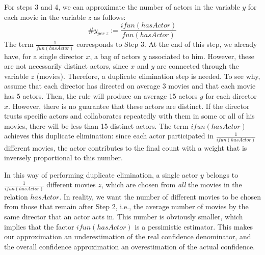 For steps 3 and 4, we can approximate the number of actors in the variable $y$ for each movie in the variable $z$ as follows:
$$
\#y_{ per \; z} := \frac{ifun(hasActor)}{fun(hasActor)}
$$
The term $\frac{1}{fun(hasActor)}$ corresponds to Step 3. At the end of this step, 
we already have, for a single director $x$, a bag of actors $y$ associated to him.
However, these are not necessarily distinct actors, since $x$ and $y$ are connected through the variable $z$ (movies). Therefore, a duplicate elimination step is needed.
To see why, assume that each director has directed on average 3 movies and that each movie has 5 actors. Then, the rule will produce on average 15 actors $y$ for each director $x$.
However, there is no guarantee that these actors are distinct.
If the director trusts specific actors and collaborates repeatedly with them in some or all of his movies, there will be less than 15 distinct actors.
The term $ifun(hasActor)$ achieves this duplicate elimination: 
since each actor participated in $\frac{1}{ifun(hasActor)}$ different movies, the actor
contributes to the final count with a weight that is inversely proportional to this number.


In this way of performing duplicate elimination, a single actor $y$ belongs to $\frac{1}{ifun(hasActor)}$ different movies $z$, 
which are chosen from \emph{all} the movies in the relation $hasActor$.
In reality, we want the number of different movies to be chosen from those that remain after Step 2, %
i.e., the average number of movies by the same director that an actor acts in. This number is obviously smaller, which
implies that the factor $ifun(hasActor)$ is a pessimistic estimator. This makes 
our approximation an underestimation of the real confidence denominator, 
and the overall confidence approximation an overestimation of the actual confidence.

